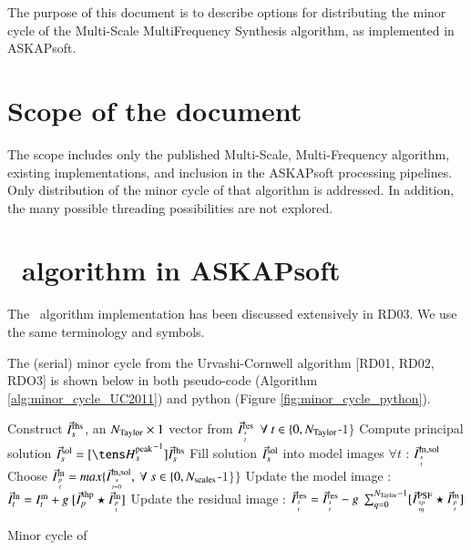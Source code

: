 \documentclass[11pt,a4paper,variablewidth]{article}
\begin{document}
The purpose of this document is to describe options for distributing the minor cycle of the Multi-Scale MultiFrequency Synthesis algorithm, as implemented in ASKAPsoft.

\section{Scope of the document}

The scope includes only the published Multi-Scale, Multi-Frequency algorithm, existing implementations, and inclusion in the ASKAPsoft processing pipelines. Only distribution of the minor cycle of that algorithm is addressed. In addition, the many possible threading possibilities are not explored. 

\clearpage

\section{\MAM\ algorithm in ASKAPsoft}

The \MAM\ algorithm implementation has been discussed extensively in RD03. We use the same terminology and symbols.

The (serial) minor cycle from the Urvashi-Cornwell algorithm [RD01, RD02, RDO3] is shown below in both pseudo-code (Algorithm \ref{alg:minor_cycle_UC2011}) and python (Figure \ref{fig:minor_cycle_python}).

\begin{algorithm}
  \SetLine
  \linesnumbered
  \dontprintsemicolon
    {
     {
       {
          Construct ${\vec{I}}^{\rm rhs}_s$, an $N_{\rm Taylor} \times 1$ vector from ${\vec{I}}^{\rm res}_{{s}\atop{t}} ~~\forall ~ t \in \{0,N_{\rm Taylor} $-$1\}$\;
          Compute principal solution $\I^{\rm sol}_s = [{\He^{\rm peak}_s}^{-1}] \I^{\rm rhs}_s$\;
          Fill solution ${\vec{I}}^{\rm sol}_s$ into model images $\forall t$ : ${\vec{I}}^{\rm m,sol}_{{s}\atop{t}}$
       }
     }
     Choose ${\vec{I}}^{\rm m}_{{p}\atop{t}} = max\{{\vec{I}}^{\rm m,sol}_{{s}\atop{t=0}},~\forall~s\in\{0,N_{\rm scales} $-$1\}\}$ \;
       {
        Update the model image : ${\vec{I}}^{\rm m}_t = I^{\rm m}_t + g ~[ {\vec{I}}^{\rm shp}_{p} \star {\vec{I}}^{\rm m}_{{p}\atop{t}}]$ \;
        }
       {
	{
          Update the residual image : ${\vec{I}}^{\rm res}_{{s}\atop{t}} = {\vec{I}}^{\rm res}_{{s}\atop{t}} - g ~\sum_{q=0}^{N_{\rm Taylor} -1}[{\vec{I}}^{\rm PSF}_{{sp}\atop{tq}} \star {\vec{I}}^{\rm m}_{{p}\atop{t}}]$\;
	}
       }
    }
\caption[Minor cycle of \MAM\ Algorithm]
         {Minor cycle of \MAM}\label{algo:ASKAP}
\label{alg:minor_cycle_UC2011}
\end{algorithm}
\end{document}
